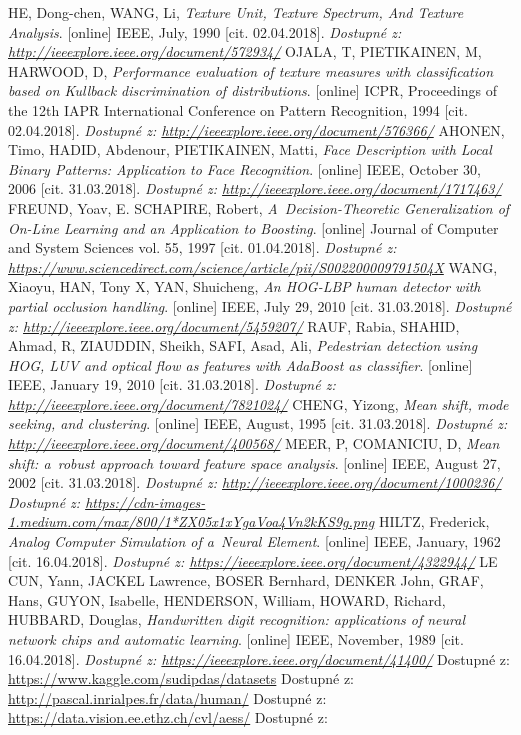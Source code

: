 \begin{thebibliography}{99}
 	 HE, Dong-chen, WANG, Li, \textit{Texture Unit, Texture Spectrum, And Texture Analysis}. [online] IEEE, July, 1990 [cit. 02.04.2018]. 
 		\textit{Dostupné z: \url{http://ieeexplore.ieee.org/document/572934/}}
 	 OJALA, T, PIETIKAINEN, M, HARWOOD, D, \textit{Performance evaluation of texture measures with classification based on Kullback discrimination of distributions}. [online] ICPR, Proceedings of the 12th IAPR International Conference on Pattern Recognition, 1994 [cit. 02.04.2018]. 
 		\textit{Dostupné z: \url{http://ieeexplore.ieee.org/document/576366/}}
	 AHONEN, Timo, HADID, Abdenour, PIETIKAINEN, Matti, \textit{Face Description with Local Binary Patterns: Application to Face Recognition}. [online] IEEE, October 30, 2006 [cit. 31.03.2018]. 
 		\textit{Dostupné z: \url{http://ieeexplore.ieee.org/document/1717463/}}
 	 FREUND, Yoav, E. SCHAPIRE, Robert, \textit{A~Decision-Theoretic Generalization of On-Line Learning and an Application to Boosting}. [online] Journal of Computer and System Sciences vol. 55, 1997 [cit. 01.04.2018]. 
 		\textit{Dostupné z: \url{https://www.sciencedirect.com/science/article/pii/S002200009791504X}}
 	 WANG, Xiaoyu, HAN, Tony X, YAN, Shuicheng, \textit{An HOG-LBP human detector with partial occlusion handling}. [online] IEEE, July 29, 2010 [cit. 31.03.2018]. 
 		\textit{Dostupné z: \url{http://ieeexplore.ieee.org/document/5459207/}}
 	 RAUF, Rabia, SHAHID, Ahmad, R, ZIAUDDIN, Sheikh, SAFI, Asad, Ali, \textit{Pedestrian detection using HOG, LUV and optical flow as features with AdaBoost as classifier}. [online] IEEE, January 19, 2010 [cit. 31.03.2018]. 
 		\textit{Dostupné z: \url{http://ieeexplore.ieee.org/document/7821024/}}
 	 CHENG, Yizong, \textit{Mean shift, mode seeking, and clustering}. [online] IEEE, August, 1995 [cit. 31.03.2018]. 
 		\textit{Dostupné z: \url{http://ieeexplore.ieee.org/document/400568/}}
 	 MEER, P, COMANICIU, D, \textit{Mean shift: a~robust approach toward feature space analysis}. [online] IEEE, August 27, 2002 [cit. 31.03.2018]. 
 		\textit{Dostupné z: \url{http://ieeexplore.ieee.org/document/1000236/}}
	 \textit{Dostupné z: \url{https://cdn-images-1.medium.com/max/800/1*ZX05x1xYgaVoa4Vn2kKS9g.png}}
	 HILTZ, Frederick, \textit{Analog Computer Simulation of a~Neural Element}. [online] IEEE, January, 1962 [cit. 16.04.2018]. 
 	\textit{Dostupné z: \url{https://ieeexplore.ieee.org/document/4322944/}}
 	 LE CUN, Yann, JACKEL Lawrence, BOSER Bernhard, DENKER John, GRAF, Hans, GUYON, Isabelle, HENDERSON, William, HOWARD, Richard, HUBBARD, Douglas, \textit{Handwritten digit recognition: applications of neural network chips and automatic learning}. [online] IEEE, November, 1989 [cit. 16.04.2018]. 
 	\textit{Dostupné z: \url{https://ieeexplore.ieee.org/document/41400/}}
 	 Dostupné z: \url{https://www.kaggle.com/sudipdas/datasets}
 	 Dostupné z: \url{http://pascal.inrialpes.fr/data/human/}
 	 Dostupné z: \url{https://data.vision.ee.ethz.ch/cvl/aess/}
 	 Dostupné z:  


\end{thebibliography}

